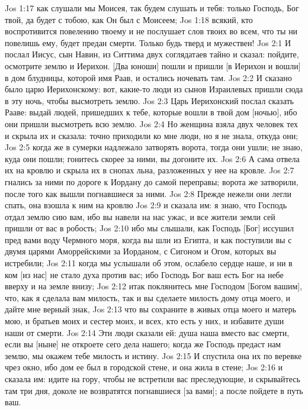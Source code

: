 \vs Jos 1:17 как слушали мы Моисея, так будем слушать и тебя: только Господь, Бог твой, да будет с тобою, как Он был с Моисеем;
\vs Jos 1:18 всякий, кто воспротивится повелению твоему и не послушает слов твоих во всем, что ты ни повелишь ему, будет предан смерти. Только будь тверд и мужествен!
\vs Jos 2:1 И послал Иисус, сын Навин, из Ситтима двух соглядатаев тайно и сказал: пойдите, осмотрите землю и Иерихон. [Два юноши] пошли и пришли [в Иерихон и вошли] в дом блудницы, которой имя Раав, и остались ночевать там.
\vs Jos 2:2 И сказано было царю Иерихонскому: вот, какие-то люди из сынов Израилевых пришли сюда в эту ночь, чтобы высмотреть землю.
\vs Jos 2:3 Царь Иерихонский послал сказать Рааве: выдай людей, пришедших к тебе, которые вошли в твой дом [ночью], ибо они пришли высмотреть всю землю.
\vs Jos 2:4 Но женщина взяла двух человек тех и скрыла их и сказала: точно приходили ко мне люди, но я не знала, откуда они;
\vs Jos 2:5 когда же в сумерки надлежало затворять ворота, тогда они ушли; не знаю, куда они пошли; гонитесь скорее за ними, вы догоните их.
\vs Jos 2:6 А сама отвела их на кровлю и скрыла их в снопах льна, разложенных у нее на кровле.
\vs Jos 2:7  гнались за ними по дороге к Иордану до самой переправы; ворота же  затворили, после того как вышли погнавшиеся за ними.
\vs Jos 2:8 Прежде нежели они легли спать, она взошла к ним на кровлю
\vs Jos 2:9 и сказала им: я знаю, что Господь отдал землю сию вам, ибо вы навели на нас ужас, и все жители земли сей пришли от вас в робость;
\vs Jos 2:10 ибо мы слышали, как Господь [Бог] иссушил пред вами воду Чермного моря, когда вы шли из Египта, и как поступили вы с двумя царями Аморрейскими за Иорданом, с Сигоном и Огом, которых вы истребили;
\vs Jos 2:11 когда мы услышали об этом, ослабело сердце наше, и ни в ком [из нас] не стало духа против вас; ибо Господь Бог ваш есть Бог на небе вверху и на земле внизу;
\vs Jos 2:12 итак поклянитесь мне Господом [Богом вашим], что, как я сделала вам милость, так и вы сделаете милость дому отца моего, и дайте мне верный знак,
\vs Jos 2:13 что вы сохраните в живых отца моего и матерь мою, и братьев моих и сестер моих, и всех, кто есть у них, и избавите души наши от смерти.
\vs Jos 2:14 Эти люди сказали ей: душа наша вместо вас  смерти, если вы [ныне] не откроете сего дела нашего; когда же Господь предаст нам землю, мы окажем тебе милость и истину.
\vs Jos 2:15 И спустила она их по веревке чрез окно, ибо дом ее был в городской стене, и она жила в стене;
\vs Jos 2:16 и сказала им: идите на гору, чтобы не встретили вас преследующие, и скрывайтесь там три дня, доколе не возвратятся погнавшиеся [за вами]; а после пойдете в путь ваш.
